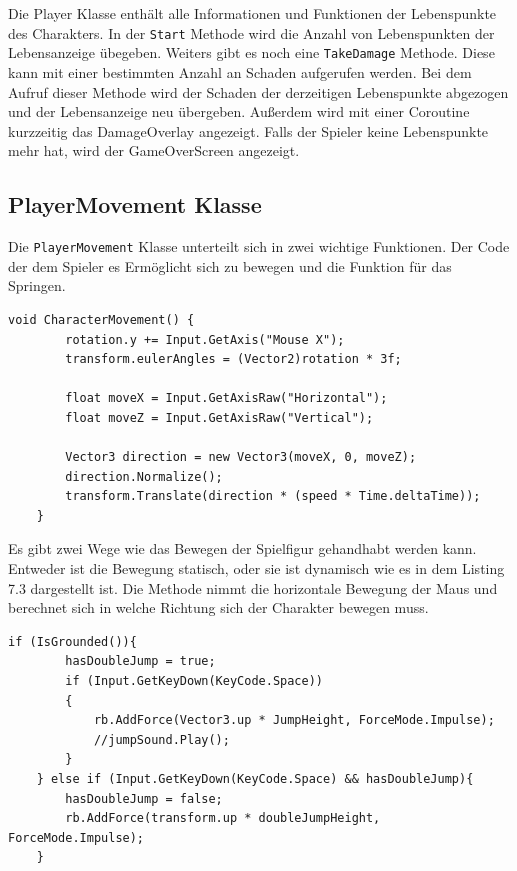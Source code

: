 Die Player Klasse enthält alle Informationen und Funktionen der Lebenspunkte des Charakters. In der \verb+Start+ Methode wird die Anzahl von Lebenspunkten der Lebensanzeige übegeben. Weiters gibt es noch eine \verb+TakeDamage+ Methode. Diese kann mit einer bestimmten Anzahl an Schaden aufgerufen werden. Bei dem Aufruf dieser Methode wird der Schaden der derzeitigen Lebenspunkte abgezogen und der Lebensanzeige neu übergeben. Außerdem wird mit einer Coroutine kurzzeitig das DamageOverlay angezeigt. Falls der Spieler keine Lebenspunkte mehr hat, wird der GameOverScreen angezeigt.
\pagebreak
\subsection{PlayerMovement Klasse}
Die \verb+PlayerMovement+ Klasse unterteilt sich in zwei wichtige Funktionen. Der Code der dem Spieler es Ermöglicht sich zu bewegen und die Funktion für das Springen.\\

\begin{lstlisting}[language=CSharp,caption={CharacterMovement},label=code:charactermovement]
    void CharacterMovement() {
        rotation.y += Input.GetAxis("Mouse X");
        transform.eulerAngles = (Vector2)rotation * 3f;
        
        float moveX = Input.GetAxisRaw("Horizontal");
        float moveZ = Input.GetAxisRaw("Vertical");
    
        Vector3 direction = new Vector3(moveX, 0, moveZ);
        direction.Normalize();
        transform.Translate(direction * (speed * Time.deltaTime));
    }
\end{lstlisting}

Es gibt zwei Wege wie das Bewegen der Spielfigur gehandhabt werden kann. Entweder ist die Bewegung statisch, oder sie ist dynamisch wie es in dem Listing 7.3 dargestellt ist. Die Methode nimmt die horizontale Bewegung der Maus und berechnet sich in welche Richtung sich der Charakter bewegen muss.\\

\begin{lstlisting}[language=CSharp,caption={Jump \& DoubleJump der PlayerMovement Klasse.},label=code:player]
    if (IsGrounded()){
        hasDoubleJump = true;
        if (Input.GetKeyDown(KeyCode.Space))
        {
            rb.AddForce(Vector3.up * JumpHeight, ForceMode.Impulse);
            //jumpSound.Play();
        }
    } else if (Input.GetKeyDown(KeyCode.Space) && hasDoubleJump){
        hasDoubleJump = false;
        rb.AddForce(transform.up * doubleJumpHeight, ForceMode.Impulse);
    }
\end{lstlisting}

